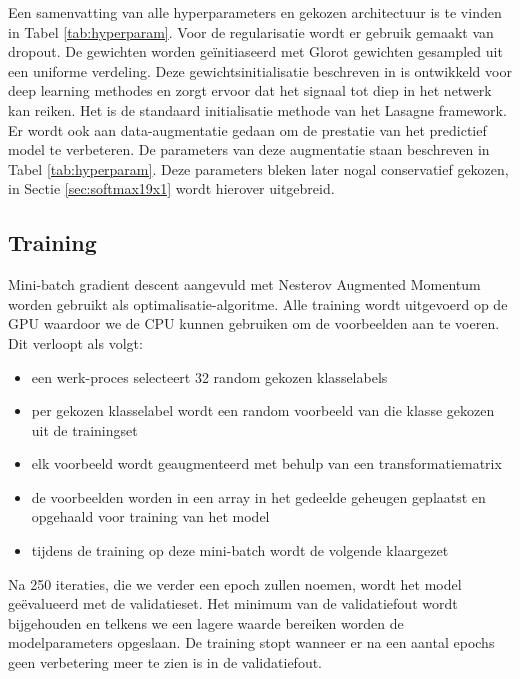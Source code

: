\npar Een samenvatting van alle hyperparameters en gekozen architectuur is te vinden in Tabel \ref{tab:hyperparam}. Voor de regularisatie wordt er gebruik gemaakt van dropout. De gewichten worden ge\"initiaseerd met Glorot gewichten gesampled uit een uniforme verdeling. Deze gewichtsinitialisatie beschreven in \cite{glorot-1} is ontwikkeld voor deep learning methodes en zorgt ervoor dat het signaal tot diep in het netwerk kan reiken. Het is de standaard initialisatie methode van het Lasagne framework.
\npar Er wordt ook aan data-augmentatie gedaan om de prestatie van het predictief model te verbeteren. De parameters van deze augmentatie staan beschreven in Tabel \ref{tab:hyperparam}. Deze parameters bleken later nogal conservatief gekozen, in Sectie \ref{sec:softmax19x1} wordt hierover uitgebreid.
\subsection{Training}
\npar Mini-batch gradient descent aangevuld met Nesterov Augmented Momentum worden gebruikt als optimalisatie-algoritme. Alle training wordt uitgevoerd op de GPU waardoor we de CPU kunnen gebruiken om de voorbeelden aan te voeren. Dit verloopt als volgt:
\begin{itemize}
	\item een werk-proces selecteert 32 random gekozen klasselabels
	\item per gekozen klasselabel wordt een random voorbeeld van die klasse gekozen uit de trainingset
	\item elk voorbeeld wordt geaugmenteerd met behulp van een transformatiematrix
	\item de voorbeelden worden in een array in het gedeelde geheugen geplaatst en opgehaald voor training van het model
	\item tijdens de training op deze mini-batch wordt de volgende klaargezet
\end{itemize}
Na 250 iteraties, die we verder een epoch zullen noemen, wordt het model ge\"evalueerd met de validatieset. Het minimum van de validatiefout wordt bijgehouden en telkens we een lagere waarde bereiken worden de modelparameters opgeslaan. De training stopt wanneer er na een aantal epochs geen verbetering meer te zien is in de validatiefout.

